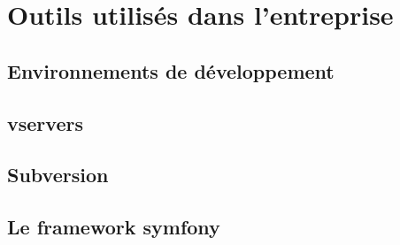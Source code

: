 \section{Outils utilisés dans l'entreprise}

\subsection{Environnements de développement}

\subsection{vservers}

\subsection{Subversion}


\subsection{Le framework symfony}
